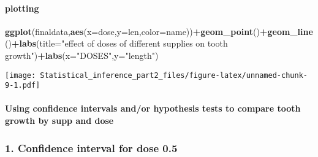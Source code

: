 \documentclass[]{article}
\newenvironment{Shaded}{\begin{snugshade}}{\end{snugshade}}
\newcommand{\KeywordTok}[1]{\textcolor[rgb]{0.13,0.29,0.53}{\textbf{#1}}}
\newcommand{\DataTypeTok}[1]{\textcolor[rgb]{0.13,0.29,0.53}{#1}}
\newcommand{\FloatTok}[1]{\textcolor[rgb]{0.00,0.00,0.81}{#1}}
\newcommand{\StringTok}[1]{\textcolor[rgb]{0.31,0.60,0.02}{#1}}
\newcommand{\OperatorTok}[1]{\textcolor[rgb]{0.81,0.36,0.00}{\textbf{#1}}}
\newcommand{\NormalTok}[1]{#1}
\let\oldparagraph\paragraph
\renewcommand{\paragraph}[1]{\oldparagraph{#1}\mbox{}}
\begin{document}
\paragraph{plotting}\label{plotting}

\begin{Shaded}
\begin{Highlighting}[]
\KeywordTok{ggplot}\NormalTok{(finaldata,}\KeywordTok{aes}\NormalTok{(}\DataTypeTok{x=}\NormalTok{dose,}\DataTypeTok{y=}\NormalTok{len,}\DataTypeTok{color=}\NormalTok{name))}\OperatorTok{+}\KeywordTok{geom_point}\NormalTok{()}\OperatorTok{+}\KeywordTok{geom_line}\NormalTok{()}\OperatorTok{+}\KeywordTok{labs}\NormalTok{(}\DataTypeTok{title=}\StringTok{"effect of doses of different supplies on tooth growth"}\NormalTok{)}\OperatorTok{+}\KeywordTok{labs}\NormalTok{(}\DataTypeTok{x=}\StringTok{"DOSES"}\NormalTok{,}\DataTypeTok{y=}\StringTok{"length"}\NormalTok{)}
\end{Highlighting}
\end{Shaded}

\texttt{[image: Statistical\_inference\_part2\_files/figure-latex/unnamed-chunk-9-1.pdf]}

\begin{Shaded}
\end{Shaded}

\paragraph{Using confidence intervals and/or hypothesis tests to compare
tooth growth by supp and
dose}\label{using-confidence-intervals-andor-hypothesis-tests-to-compare-tooth-growth-by-supp-and-dose}

\subsubsection{1. Confidence interval for dose
0.5}\label{confidence-interval-for-dose-0.5}

\begin{Shaded}
\end{Shaded}
\end{document}
